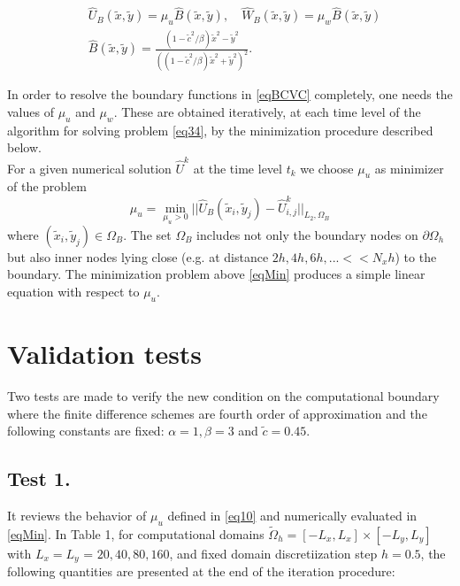 \documentclass[12pt]{article}
\newcommand{\dO}{\partial\Omega_{h}}
\theoremstyle{theorem}
\theoremstyle{defi}
\begin{document}
\begin{equation}\label{eqBCVC}
\begin{split}
&\widehat U_B(\tilde{x} , \tilde y) = \mu_u \widehat B( \tilde x, \tilde y) , \quad
\widehat W_B(\tilde{x} , \tilde y) = \mu_w \widehat B( \tilde x, \tilde y) \\
&\widehat B(\tilde{x} , \tilde y) = \frac{ (1 - \tilde c^2/ \beta) \tilde x^2 - \tilde y^2}{( (1 - \tilde c^2/ \beta) \tilde x^2 + \tilde y^2)^2}. 
\end{split}
\end{equation}

In order to resolve the boundary functions in \eqref{eqBCVC} completely, one needs the values of $\mu_u$  and $\mu_w$. These are obtained iteratively, at each time level of the algorithm for solving problem \eqref{eq34}, by the minimization procedure described below. 
\\
For a given numerical solution $\widehat U ^k$  at the time level  $t_k$ we choose $\mu_u$  as minimizer of the problem
\begin{equation}\label{eqMin}
\mu_u = \min_{ \mu_u > 0 } || \widehat U_B( \tilde x_i, \tilde y_j) - \widehat U ^k_{i,j} ||_{L_2,\Omega_B}
\end{equation}
where  $( \tilde x_i, \tilde y_j) \in \Omega_B$. The set $\Omega_B$ includes not only the boundary nodes on $\dO$ but also inner nodes lying close (e.g. at distance $2h, 4h, 6h, ... << N_x h $) to the boundary. The minimization problem above \eqref{eqMin} produces a simple linear equation with respect to $\mu_u$.

\section{Validation tests}

Two tests are made to verify the new condition on the computational boundary where the finite difference schemes are fourth order of approximation and the following constants are fixed:
 $\alpha = 1, \beta = 3$  and  $ \tilde c = 0.45$.

\subsection{Test 1.}

It reviews the behavior of $\mu_u$  defined in  \eqref{eq10} and numerically evaluated in \eqref{eqMin}. In Table 1, for computational domains  $\tilde \Omega_h = [-L_{ x}, L_{ x}] \times  [-L_{ y}, L_{ y}]$
with $ L_{ x} = L_{ y}$ = $20, 40, 80, 160$, and fixed domain discretiization step $h = 0.5$, the following quantities are presented at the end of the iteration procedure:
\end{document}
